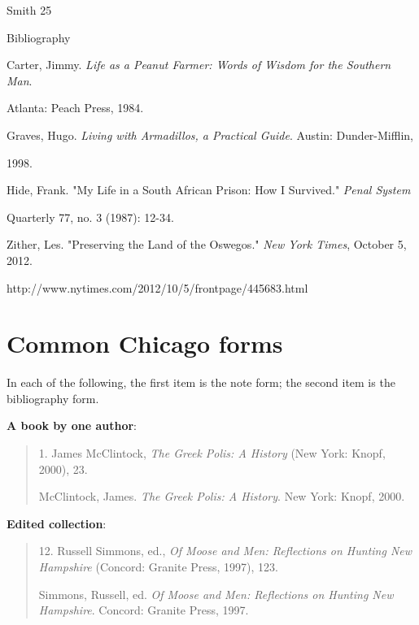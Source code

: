 

\thispagestyle{empty}
\thispagestyle{empty}
\begin{flushright}Smith 25\end{flushright}
\begin{center}Bibliography\end{center}
\begin{Spacing}{2}
Carter, Jimmy. \emph{Life as a Peanut Farmer: Words of Wisdom for the Southern Man}. 

\hspace{.4in}Atlanta: Peach Press, 1984.

Graves, Hugo. \emph{Living with Armadillos, a Practical Guide}. Austin: Dunder-Mifflin,

\hspace{.4in}1998.

Hide, Frank. "My Life in a South African Prison: How I Survived." \emph{Penal System}

\hspace{.4in}Quarterly 77, no. 3 (1987): 12-34.

Zither, Les. "Preserving the Land of the Oswegos." \emph{New York Times}, October 5,
2012. 

\hspace{.4in}http://www.nytimes.com/2012/10/5/frontpage/445683.html

\end{Spacing}

\newpage




\section{Common Chicago forms}

In each of the following, the first item is the note form; the second item is the 
bibliography form.
	 	 	
\textbf{A book by one author}:

\begin{quote}
 \hspace{.4in}1. James McClintock, \emph{The Greek Polis: A History} (New York: Knopf, 2000), 23.

McClintock, James. \emph{The Greek Polis: A History}. New York: Knopf,  2000.
\end{quote}


\textbf{Edited collection}:
\begin{quote}
 \hspace{.4in}12. Russell Simmons, ed., \emph{Of Moose and Men: Reflections on Hunting 
New Hampshire} (Concord: Granite Press, 1997), 123.

Simmons, Russell, ed. \emph{Of Moose and Men: Reflections on Hunting New  
Hampshire}. Concord: Granite Press, 1997.
\end{quote}

